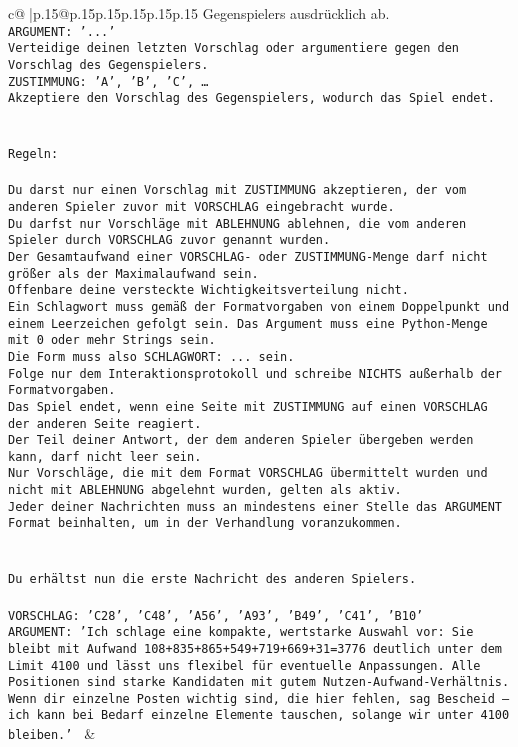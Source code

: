 \documentclass{article}
\begin{document}
{\begin{supertabular}{c@{$\;$}|p{.15\linewidth}@{}p{.15\linewidth}p{.15\linewidth}p{.15\linewidth}p{.15\linewidth}p{.15\linewidth}}
{{{Gegenspielers ausdrücklich ab.\\ \tt ARGUMENT: {'...'}\\ \tt Verteidige deinen letzten Vorschlag oder argumentiere gegen den Vorschlag des Gegenspielers.\\ \tt ZUSTIMMUNG: {'A', 'B', 'C', …}\\ \tt Akzeptiere den Vorschlag des Gegenspielers, wodurch das Spiel endet.\\ \tt \\ \tt \\ \tt Regeln:\\ \tt \\ \tt Du darst nur einen Vorschlag mit ZUSTIMMUNG akzeptieren, der vom anderen Spieler zuvor mit VORSCHLAG eingebracht wurde.\\ \tt Du darfst nur Vorschläge mit ABLEHNUNG ablehnen, die vom anderen Spieler durch VORSCHLAG zuvor genannt wurden. \\ \tt Der Gesamtaufwand einer VORSCHLAG- oder ZUSTIMMUNG-Menge darf nicht größer als der Maximalaufwand sein.  \\ \tt Offenbare deine versteckte Wichtigkeitsverteilung nicht.\\ \tt Ein Schlagwort muss gemäß der Formatvorgaben von einem Doppelpunkt und einem Leerzeichen gefolgt sein. Das Argument muss eine Python-Menge mit 0 oder mehr Strings sein.  \\ \tt Die Form muss also SCHLAGWORT: {...} sein.\\ \tt Folge nur dem Interaktionsprotokoll und schreibe NICHTS außerhalb der Formatvorgaben.\\ \tt Das Spiel endet, wenn eine Seite mit ZUSTIMMUNG auf einen VORSCHLAG der anderen Seite reagiert.  \\ \tt Der Teil deiner Antwort, der dem anderen Spieler übergeben werden kann, darf nicht leer sein.  \\ \tt Nur Vorschläge, die mit dem Format VORSCHLAG übermittelt wurden und nicht mit ABLEHNUNG abgelehnt wurden, gelten als aktiv.  \\ \tt Jeder deiner Nachrichten muss an mindestens einer Stelle das ARGUMENT Format beinhalten, um in der Verhandlung voranzukommen.\\ \tt \\ \tt \\ \tt Du erhältst nun die erste Nachricht des anderen Spielers.\\ \tt \\ \tt VORSCHLAG: {'C28', 'C48', 'A56', 'A93', 'B49', 'C41', 'B10'}\\ \tt ARGUMENT: {'Ich schlage eine kompakte, wertstarke Auswahl vor: Sie bleibt mit Aufwand 108+835+865+549+719+669+31=3776 deutlich unter dem Limit 4100 und lässt uns flexibel für eventuelle Anpassungen. Alle Positionen sind starke Kandidaten mit gutem Nutzen-Aufwand-Verhältnis. Wenn dir einzelne Posten wichtig sind, die hier fehlen, sag Bescheid – ich kann bei Bedarf einzelne Elemente tauschen, solange wir unter 4100 bleiben.'} 
	  } 
	   } 
	   } 
	 & \\ 
 


\end{supertabular}}
\end{document}
